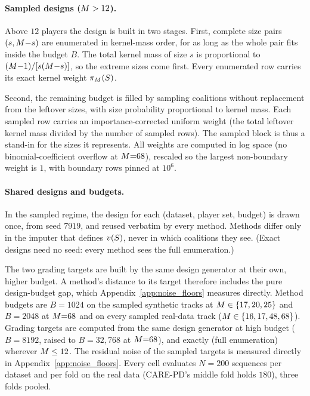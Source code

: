 \paragraph{Sampled designs ($M > 12$).}
Above $12$ players the design is built in two stages.  First, complete size
pairs $(s, M{-}s)$ are enumerated in kernel-mass order, for as long as the
whole pair fits inside the budget $B$.  The total kernel mass of size $s$ is
proportional to $(M{-}1)/[s(M{-}s)]$, so the extreme sizes come first.
Every enumerated row carries its exact kernel weight $\pi_{M}(S)$.

Second, the remaining budget is filled by sampling coalitions without
replacement from the leftover sizes, with size probability proportional to
kernel mass.  Each sampled row carries an importance-corrected uniform
weight (the total leftover kernel mass divided by the number of sampled
rows).  The sampled block is thus a stand-in for the sizes it
represents.  All weights are computed in log space (no binomial-coefficient
overflow at $M{=}68$), rescaled so the largest non-boundary weight is
$1$, with boundary rows pinned at $10^{6}$.

\paragraph{Shared designs and budgets.}
In the sampled regime, the design for each (dataset, player set, budget) is
drawn once, from seed $7919$, and reused verbatim by every method.  Methods
differ only in the imputer that defines $v(S)$, never in which
coalitions they see.  (Exact designs need no seed: every method sees the
full enumeration.)

The two grading targets are built by the same design generator at their own,
higher budget.  A method's distance to its target therefore includes the
pure design-budget gap, which Appendix~\ref{app:noise_floors} measures
directly.  Method budgets are $B{=}1024$ on the sampled synthetic tracks at
$M \in \{17, 20, 25\}$ and $B{=}2048$ at $M{=}68$ and on every sampled
real-data track ($M \in \{16, 17, 48, 68\}$).  Grading targets are
computed from the same design generator at high budget ($B{=}8192$, raised
to $B{=}32{,}768$ at $M{=}68$), and exactly (full enumeration) wherever
$M \leq 12$.  The residual noise of the sampled targets is measured
directly in Appendix~\ref{app:noise_floors}.  Every cell evaluates
$N{=}200$ sequences per dataset and per fold on the real data (CARE-PD's
middle fold holds $180$), three folds pooled.


